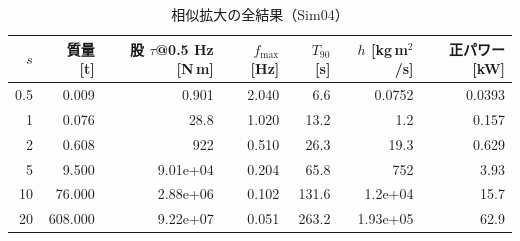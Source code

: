 \begin{longtable}{rrrrrrr}
\caption{相似拡大の全結果（Sim04）}\\
\toprule
$s$ & 質量 [t] & 股 $\tau$@0.5 Hz [N\,m] & $f_{\max}$ [Hz] & $T_{90}$ [s] & $h$ [kg\,m$^2$/s] & 正パワー [kW] \\ \midrule \endhead
0.5 & 0.009 & 0.901 & 2.040 & 6.6 & 0.0752 & 0.0393 \\
1 & 0.076 & 28.8 & 1.020 & 13.2 & 1.2 & 0.157 \\
2 & 0.608 & 922 & 0.510 & 26.3 & 19.3 & 0.629 \\
5 & 9.500 & 9.01e+04 & 0.204 & 65.8 & 752 & 3.93 \\
10 & 76.000 & 2.88e+06 & 0.102 & 131.6 & 1.2e+04 & 15.7 \\
20 & 608.000 & 9.22e+07 & 0.051 & 263.2 & 1.93e+05 & 62.9 \\
\bottomrule
\end{longtable}
